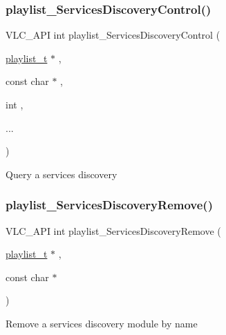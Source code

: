 \subsubsection{\texorpdfstring{playlist\+\_\+\+Services\+Discovery\+Control()}{playlist\_ServicesDiscoveryControl()}}
{\footnotesize\ttfamily V\+L\+C\+\_\+\+A\+PI int playlist\+\_\+\+Services\+Discovery\+Control (\begin{DoxyParamCaption}\item[{\hyperlink{structplaylist__t}{playlist\+\_\+t} $\ast$}]{,  }\item[{const char $\ast$}]{,  }\item[{int}]{,  }\item[{}]{... }\end{DoxyParamCaption})}

Query a services discovery \mbox{\label{group__vlc__playlist_ga91ffcf04d843ab08f7a460296d37595d}} 
\subsubsection{\texorpdfstring{playlist\+\_\+\+Services\+Discovery\+Remove()}{playlist\_ServicesDiscoveryRemove()}}
{\footnotesize\ttfamily V\+L\+C\+\_\+\+A\+PI int playlist\+\_\+\+Services\+Discovery\+Remove (\begin{DoxyParamCaption}\item[{\hyperlink{structplaylist__t}{playlist\+\_\+t} $\ast$}]{,  }\item[{const char $\ast$}]{ }\end{DoxyParamCaption})}

Remove a services discovery module by name 